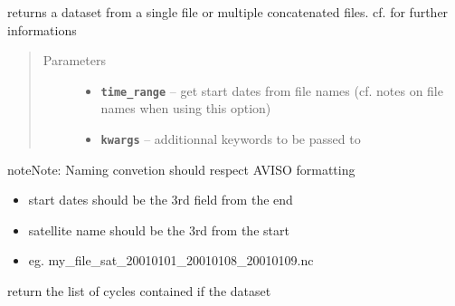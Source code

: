 \documentclass[letterpaper,10pt,english]{sphinxmanual}
\begin{document}
\begin{fulllineitems}
\begin{fulllineitems}
\label{altimetry.data:altimetry.data.alti_data.__init__}
returns a dataset from a single file or multiple concatenated files. cf. {\hyperref[altimetry.data:altimetry.data.hydro_data]{\emph{}}} for further informations
\begin{quote}\begin{description}
\item[{Parameters}] \leavevmode\begin{itemize}
\item {} 
\textbf{\texttt{time\_range}} -- get start dates from file names (cf. notes on file names when using this option)

\item {} 
\textbf{\texttt{kwargs}} -- additionnal keywords to be passed to {\hyperref[altimetry.data:altimetry.data.hydro_data.__init__]{\emph{}}}

\end{itemize}

\end{description}\end{quote}

\begin{notice}{note}{Note:}
Naming convetion should respect AVISO formatting
\begin{itemize}
\item {} 
start dates should be the 3rd field from the end

\item {} 
satellite name should be the 3rd from the start

\item {} 
eg. my\_file\_sat\_20010101\_20010108\_20010109.nc

\end{itemize}
\end{notice}

\end{fulllineitems}


\begin{fulllineitems}
\label{altimetry.data:altimetry.data.alti_data.cycle_list}
return the list of cycles contained if the dataset


\end{fulllineitems}
\end{fulllineitems}
\end{document}
